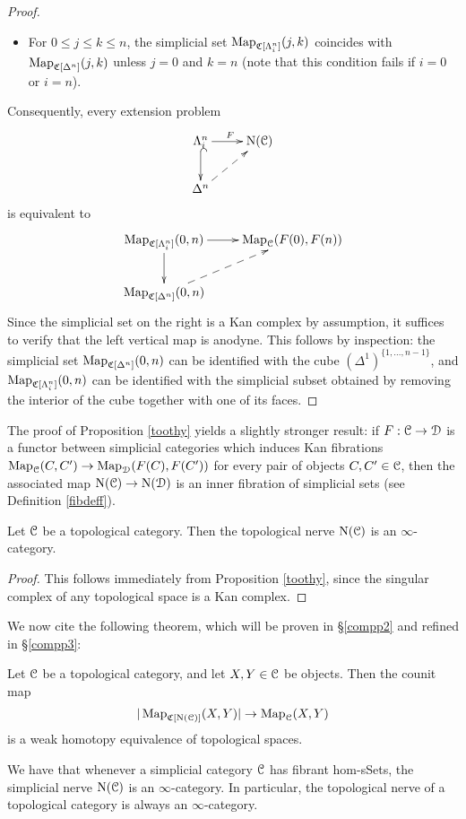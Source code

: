 \begin{1.1.5 inf-cats vs simplicial cats}
\begin{proof}
\begin{itemize}
\item For $0 \leq j \leq k \leq n$, the simplicial set
$\operatorname{{Map}}_{\operatorname{\mathfrak{C}}[\Lambda^n_i]}(j,k)$ coincides with
$\operatorname{{Map}}_{\operatorname{\mathfrak{C}}[\Delta^n]}(j,k)$ unless $j=0$ and $k=n$
(note that this condition fails if $i=0$ or $i=n$).
\end{itemize}

Consequently, every extension problem
$$ \xymatrix{ \Lambda^n_i \ar@{^{(}->}[d] \ar[r]^{F} & \Nerve(\calC) \\
\Delta^n \ar@{-->}[ur] & }$$
is equivalent to
$$\xymatrix{ \bHom_{\sCoNerve[\Lambda^n_i]}(0,n) \ar[d] \ar[r] & \bHom_{\calC}(F(0), F(n)) \\
\bHom_{ \sCoNerve[\Delta^n]}(0,n) \ar@{-->}[ur]. & }$$
Since the simplicial set on the right is a Kan complex by assumption, it suffices to verify that the left vertical map is anodyne. This follows by inspection: the simplicial set $\operatorname{{Map}}_{ \operatorname{\mathfrak{C}}[ \Delta^n]}(0,n)$ can be identified with the cube $( \Delta^1 )^{ \{ 1, \ldots, n-1\} }$, and 
$\operatorname{{Map}}_{\operatorname{\mathfrak{C}}[ \Lambda^n_i]}(0,n)$ can be identified with the simplicial subset obtained by removing the interior of the cube together with one of its faces.
\end{proof}

\begin{remark}\label{goobrem}
The proof of Proposition \ref{toothy} yields a slightly stronger result: if $F: \operatorname{\mathcal{C}} \rightarrow \operatorname{\mathcal{D}}$ is a functor between simplicial categories which induces Kan fibrations
$\operatorname{{Map}}_{\operatorname{\mathcal{C}}}(C,C') \rightarrow \operatorname{{Map}}_{\operatorname{\mathcal{D}}}(F(C),F(C'))$ for every pair of objects $C,C' \in \operatorname{\mathcal{C}}$, then the associated map $\operatorname{N}(\operatorname{\mathcal{C}}) \rightarrow \operatorname{N}(\operatorname{\mathcal{D}})$ is an inner fibration of simplicial sets (see Definition \ref{fibdeff}).
\end{remark}

\begin{corollary}\label{tooky}
Let $\operatorname{\mathcal{C}}$ be a topological category. Then the topological nerve $\operatorname{N}(\operatorname{\mathcal{C}})$ is an $\infty$-category.
\end{corollary}

\begin{proof}
This follows immediately from Proposition \ref{toothy}, since the singular complex of any topological space is a Kan complex.
\end{proof}

We now cite the
following theorem, which will be proven in \S \ref{compp2} and refined in \S \ref{compp3}:

\begin{theorem}\label{biggie}
Let $\operatorname{\mathcal{C}}$ be a topological category, and let $X, Y \in \operatorname{\mathcal{C}}$ be
objects. Then the counit map
$$|\operatorname{{Map}}_{\operatorname{\mathfrak{C}}[\operatorname{N}(\operatorname{\mathcal{C}})]}(X,Y)| \rightarrow \operatorname{{Map}}_{\operatorname{\mathcal{C}}}(X,Y)$$
is a weak homotopy equivalence of topological spaces.
\end{theorem}
\begin{shaded}
We have that whenever a simplicial category $\operatorname{\mathcal{C}}$ has fibrant hom-sSets, the simplicial nerve $\operatorname{N}(\operatorname{\mathcal{C}})$ is an $\infty$-category. In particular, the topological nerve of a topological category is always an $\infty$-category.


\end{shaded}
\end{1.1.5 inf-cats vs simplicial cats}
